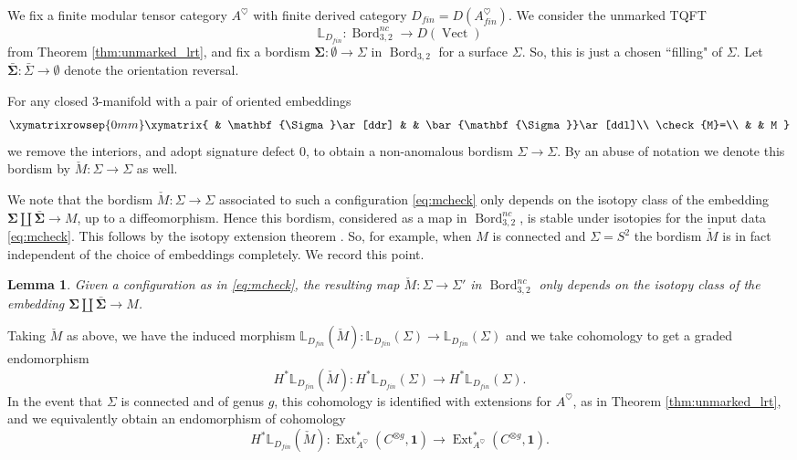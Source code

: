 \documentclass[reqno]{amsart}
\newtheorem{lemma}{Lemma}[section]
\theoremstyle{definition}
\newcommand{\mbb}[1]{\mathbb{#1}}
\newcommand{\mbf}[1]{\mathbf{#1}}
\newcommand{\opn}[1]{\operatorname{#1}}
\newcommand{\ot}{\otimes}
\DeclareMathOperator{\Ext}{Ext}
\DeclareMathOperator{\Bord}{Bord}
\renewcommand{\1}{\mathbf{1}}
\begin{document}
We fix a finite modular tensor category $A^{\heartsuit}$ with finite derived category $D_{fin}=D(A^{\heartsuit}_{fin})$.  We consider the unmarked TQFT
\[
\mbb{L}_{D_{fin}}:\Bord_{3,2}^{nc}\to D(\opn{Vect})
\]
from Theorem \ref{thm:unmarked_lrt}, and fix a bordism $\mbf{\Sigma}:\emptyset\to \Sigma$ in $\Bord_{3,2}$ for a surface $\Sigma$.  So, this is just a chosen ``filling" of $\Sigma$.  Let $\bar{\mbf{\Sigma}}:\bar{\Sigma}\to \emptyset$ denote the orientation reversal.
\par

For any closed $3$-manifold with a pair of oriented embeddings
\begin{equation}\label{eq:mcheck}
\xymatrixrowsep{0mm}
\xymatrix{
& \mbf{\Sigma}\ar[ddr] & & \bar{\mbf{\Sigma}}\ar[ddl]\\
\check{M}=\\
&	& M
}
\end{equation}
we remove the interiors, and adopt signature defect $0$, to obtain a non-anomalous bordism $\Sigma\to \Sigma$.  By an abuse of notation we denote this bordism by $\check{M}:\Sigma\to \Sigma$ as well.

We note that the bordism $\check{M}:\Sigma\to \Sigma$ associated to such a configuration \eqref{eq:mcheck} only depends on the isotopy class of the embedding $\mbf{\Sigma}\amalg\bar{\mbf{\Sigma}}\to M$, up to a diffeomorphism.  Hence this bordism, considered as a map in $\Bord^{nc}_{3,2}$, is stable under isotopies for the input data \eqref{eq:mcheck}.  This follows by the isotopy extension theorem \cite{palais60,lima63}.  So, for example, when $M$ is connected and $\Sigma=S^2$ the bordism $\check{M}$ is in fact independent of the choice of embeddings completely. We record this point.

\begin{lemma}\label{lem:iet}
Given a configuration as in \eqref{eq:mcheck}, the resulting map $\check{M}:\Sigma\to \Sigma'$ in $\Bord^{nc}_{3,2}$ only depends on the isotopy class of the embedding $\mbf{\Sigma}\amalg\bar{\mbf{\Sigma}}\to M$.
\end{lemma}

Taking $\check{M}$ as above, we have the induced morphism $\mbb{L}_{D_{fin}}(\check{M}):\mbb{L}_{D_{fin}}(\Sigma)\to \mbb{L}_{D_{fin}}(\Sigma)$ and we take cohomology to get a graded endomorphism
\begin{equation}\label{eq:4601}
H^{\ast}\mbb{L}_{D_{fin}}(\check{M}):H^{\ast}\mbb{L}_{D_{fin}}(\Sigma)\to H^{\ast}\mbb{L}_{D_{fin}}(\Sigma).
\end{equation}
In the event that $\Sigma$ is connected and of genus $g$, this cohomology is identified with extensions for $A^{\heartsuit}$, as in Theorem \ref{thm:unmarked_lrt}, and we equivalently obtain an endomorphism of cohomology
\[
H^{\ast}\mbb{L}_{D_{fin}}(\check{M}):\Ext_{A^{\heartsuit}}^{\ast}(C^{\ot g},\1)\to \Ext_{A^{\heartsuit}}^{\ast}(C^{\ot g},\1).
\]
\end{document}
